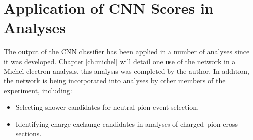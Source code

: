 \newpage
\section{Application of CNN Scores in \protodune{} Analyses} \label{cnn-appl}
The output of the CNN classifier has been applied in a number of \protodune{}
analyses since it was developed. Chapter \ref{ch:michel} will detail one use of
the network in a Michel electron analysis, this analysis was completed by the
author. In addition, the network is being incorporated into analyses by other
members of the \protodune{} experiment, including:
\begin{itemize}
	\item Selecting shower candidates for neutral pion event selection\cite{pi_0}.
	\item Identifying charge exchange candidates in analyses of charged--pion
		cross sections\cite{pion_exchange}.
\end{itemize}
